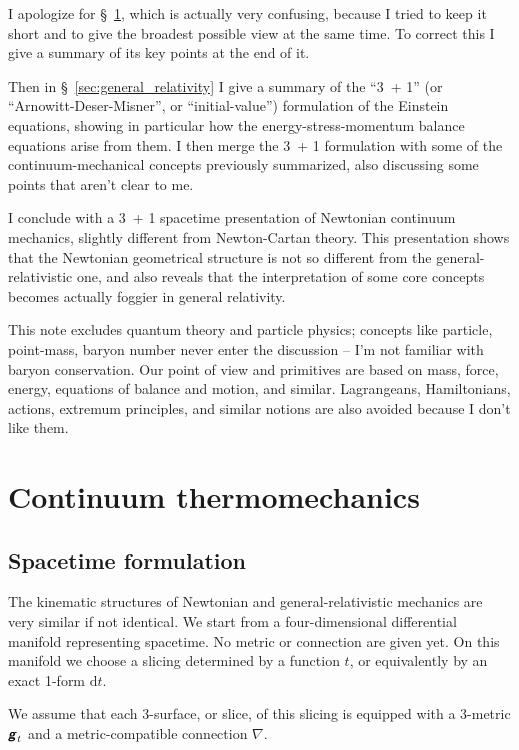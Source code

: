 \documentclass[\ifafour a4paper,12pt,\else a5paper,10pt,\fi%
onecolumn,oneside,article,%
british%
]{memoir}
\theoremstyle{remark}
\theoremstyle{innote}
\newcommand*{\mathte}[1]{\textbf{\textit{\textsf{#1}}}}
\newcommand*{\di}{\mathrm{d}}%
\renewcommand*{\|}{\nonscript\,\vert\nonscript\;\mathopen{}}
\newcommand*{\sect}{\S}%
\newcommand*{\ygg}{g}
\newcommand*{\yg}{\mathte{\ygg}}
\newcommand*{\ynab}{\nabla}
\begin{document}
I apologize for \sect~\ref{sec:newtonian_continuum_thermomechanics}, which
is actually very confusing, because I tried to keep it short and to give
the broadest possible view at the same time. To correct this I give a
summary of its key points at the end of it.

Then in \sect~\ref{sec:general_relativity} I give a summary of the
\enquote{3~+ 1} (or \enquote{Arnowitt-Deser-Misner}, or
\enquote{initial-value}) formulation of the Einstein equations, showing in
particular how the energy-stress-momentum balance equations arise from
them. I then merge the 3~+ 1 formulation with some of the
continuum-mechanical concepts previously summarized, also discussing some
points that aren't clear to me.

I conclude with a 3~+ 1 spacetime presentation of Newtonian continuum
mechanics, slightly different from Newton-Cartan theory. This presentation
shows that the Newtonian geometrical structure is not so different from the
general-relativistic one, and also reveals that the interpretation of some
core concepts becomes actually foggier in general relativity.

This note excludes quantum theory and particle physics; concepts like
particle, point-mass, baryon number never enter the discussion -- I'm not
familiar with baryon conservation. Our point of view and primitives are
based on mass, force, energy, equations of balance and motion, and similar.
Lagrangeans, Hamiltonians, actions, extremum principles, and similar
notions are also avoided because I don't like them.


\section{Continuum thermomechanics}
\label{sec:newtonian_continuum_thermomechanics}


\subsection{Spacetime formulation}
\label{sec:newtonian_mechanics_spacetime}

The kinematic structures of Newtonian and general-relativistic mechanics
are very similar if not identical. We start from a four-dimensional
differential manifold representing spacetime. No metric or connection are
given yet. On this manifold we choose a slicing determined by a function
$t$, or equivalently by an exact 1-form $\di t$.


We assume that each 3-surface, or slice, of this slicing is equipped with
a 3-metric $\yg_t$ and a metric-compatible connection $\ynab$.
\end{document}
